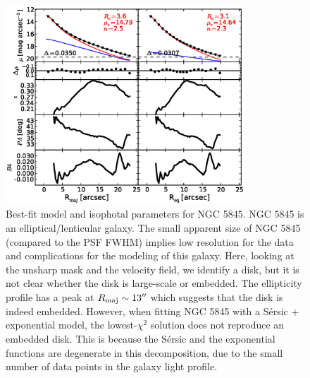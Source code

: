 \documentclass[preprint2]{emulateapj}
\newcommand{\fitfigurewidth}{0.8\textwidth}
\begin{document}
  \begin{figure}[h]
  \begin{center}
  \includegraphics[width=\fitfigurewidth]{images/n5845_1Dfit.eps}
  \caption{Best-fit model and isophotal parameters for NGC 5845.
  NGC 5845 is an elliptical/lenticular galaxy. 
  The small apparent size of NGC 5845 (compared to the PSF FWHM) implies low resolution for the data 
  and complications for the modeling of this galaxy.
  Here, looking at the unsharp mask and the velocity field, we identify a disk, but it is not clear whether the disk is large-scale or embedded.
  The ellipticity profile has a peak at $R_{\rm maj} \sim 13''$ which suggests that the disk is indeed embedded.
  However, when fitting NGC 5845 with a S\'ersic + exponential model, 
  the lowest-$\chi^2$ solution does not reproduce an embedded disk.
  This is because the S\'ersic and the exponential functions are degenerate in this decomposition, 
  due to the small number of data points in the galaxy light profile.
  }
  \end{center}
  \end{figure}
\end{document}
